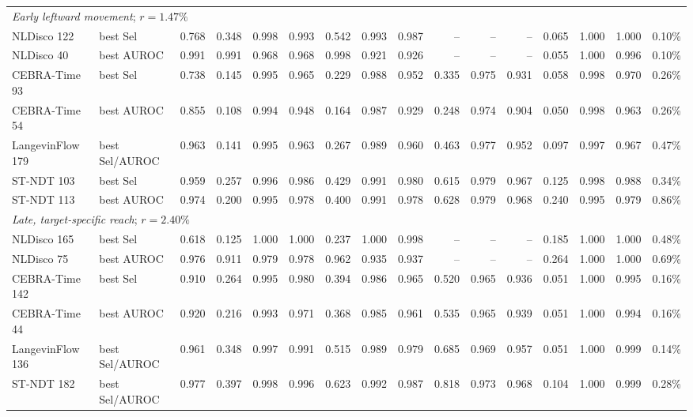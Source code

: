 \begin{tabular}{llrrrrrrrrrrrrrr}
\midrule
\multicolumn{15}{l}{\textit{Early leftward movement}; $r=1.47\%$} \\
NLDisco 122 & best Sel & 0.768 & 0.348 & 0.998 & 0.993 & 0.542 & 0.993 & 0.987 & -- & -- & -- & 0.065 & 1.000 & 1.000 & 0.10\% \\
NLDisco 40 & best AUROC & 0.991 & 0.991 & 0.968 & 0.968 & 0.998 & 0.921 & 0.926 & -- & -- & -- & 0.055 & 1.000 & 0.996 & 0.10\% \\
CEBRA-Time 93 & best Sel & 0.738 & 0.145 & 0.995 & 0.965 & 0.229 & 0.988 & 0.952 & 0.335 & 0.975 & 0.931 & 0.058 & 0.998 & 0.970 & 0.26\% \\
CEBRA-Time 54 & best AUROC & 0.855 & 0.108 & 0.994 & 0.948 & 0.164 & 0.987 & 0.929 & 0.248 & 0.974 & 0.904 & 0.050 & 0.998 & 0.963 & 0.26\% \\
LangevinFlow 179 & best Sel/AUROC & 0.963 & 0.141 & 0.995 & 0.963 & 0.267 & 0.989 & 0.960 & 0.463 & 0.977 & 0.952 & 0.097 & 0.997 & 0.967 & 0.47\% \\
ST-NDT 103 & best Sel & 0.959 & 0.257 & 0.996 & 0.986 & 0.429 & 0.991 & 0.980 & 0.615 & 0.979 & 0.967 & 0.125 & 0.998 & 0.988 & 0.34\% \\
ST-NDT 113 & best AUROC & 0.974 & 0.200 & 0.995 & 0.978 & 0.400 & 0.991 & 0.978 & 0.628 & 0.979 & 0.968 & 0.240 & 0.995 & 0.979 & 0.86\% \\
\midrule
\multicolumn{15}{l}{\textit{Late, target-specific reach}; $r=2.40\%$} \\
NLDisco 165 & best Sel & 0.618 & 0.125 & 1.000 & 1.000 & 0.237 & 1.000 & 0.998 & -- & -- & -- & 0.185 & 1.000 & 1.000 & 0.48\% \\
NLDisco 75 & best AUROC & 0.976 & 0.911 & 0.979 & 0.978 & 0.962 & 0.935 & 0.937 & -- & -- & -- & 0.264 & 1.000 & 1.000 & 0.69\% \\
CEBRA-Time 142 & best Sel & 0.910 & 0.264 & 0.995 & 0.980 & 0.394 & 0.986 & 0.965 & 0.520 & 0.965 & 0.936 & 0.051 & 1.000 & 0.995 & 0.16\% \\
CEBRA-Time 44 & best AUROC & 0.920 & 0.216 & 0.993 & 0.971 & 0.368 & 0.985 & 0.961 & 0.535 & 0.965 & 0.939 & 0.051 & 1.000 & 0.994 & 0.16\% \\
LangevinFlow 136 & best Sel/AUROC & 0.961 & 0.348 & 0.997 & 0.991 & 0.515 & 0.989 & 0.979 & 0.685 & 0.969 & 0.957 & 0.051 & 1.000 & 0.999 & 0.14\% \\
ST-NDT 182 & best Sel/AUROC & 0.977 & 0.397 & 0.998 & 0.996 & 0.623 & 0.992 & 0.987 & 0.818 & 0.973 & 0.968 & 0.104 & 1.000 & 0.999 & 0.28\% \\
\bottomrule
\end{tabular}
